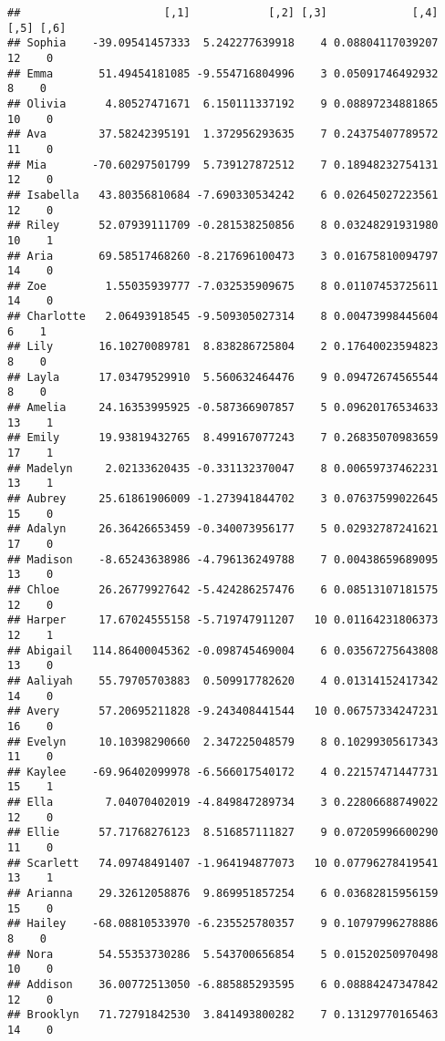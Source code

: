 \documentclass[
]{article}
\begin{document}
\begin{verbatim}
##                      [,1]            [,2] [,3]             [,4] [,5] [,6]
## Sophia    -39.09541457333  5.242277639918    4 0.08804117039207   12    0
## Emma       51.49454181085 -9.554716804996    3 0.05091746492932    8    0
## Olivia      4.80527471671  6.150111337192    9 0.08897234881865   10    0
## Ava        37.58242395191  1.372956293635    7 0.24375407789572   11    0
## Mia       -70.60297501799  5.739127872512    7 0.18948232754131   12    0
## Isabella   43.80356810684 -7.690330534242    6 0.02645027223561   12    0
## Riley      52.07939111709 -0.281538250856    8 0.03248291931980   10    1
## Aria       69.58517468260 -8.217696100473    3 0.01675810094797   14    0
## Zoe         1.55035939777 -7.032535909675    8 0.01107453725611   14    0
## Charlotte   2.06493918545 -9.509305027314    8 0.00473998445604    6    1
## Lily       16.10270089781  8.838286725804    2 0.17640023594823    8    0
## Layla      17.03479529910  5.560632464476    9 0.09472674565544    8    0
## Amelia     24.16353995925 -0.587366907857    5 0.09620176534633   13    1
## Emily      19.93819432765  8.499167077243    7 0.26835070983659   17    1
## Madelyn     2.02133620435 -0.331132370047    8 0.00659737462231   13    1
## Aubrey     25.61861906009 -1.273941844702    3 0.07637599022645   15    0
## Adalyn     26.36426653459 -0.340073956177    5 0.02932787241621   17    0
## Madison    -8.65243638986 -4.796136249788    7 0.00438659689095   13    0
## Chloe      26.26779927642 -5.424286257476    6 0.08513107181575   12    0
## Harper     17.67024555158 -5.719747911207   10 0.01164231806373   12    1
## Abigail   114.86400045362 -0.098745469004    6 0.03567275643808   13    0
## Aaliyah    55.79705703883  0.509917782620    4 0.01314152417342   14    0
## Avery      57.20695211828 -9.243408441544   10 0.06757334247231   16    0
## Evelyn     10.10398290660  2.347225048579    8 0.10299305617343   11    0
## Kaylee    -69.96402099978 -6.566017540172    4 0.22157471447731   15    1
## Ella        7.04070402019 -4.849847289734    3 0.22806688749022   12    0
## Ellie      57.71768276123  8.516857111827    9 0.07205996600290   11    0
## Scarlett   74.09748491407 -1.964194877073   10 0.07796278419541   13    1
## Arianna    29.32612058876  9.869951857254    6 0.03682815956159   15    0
## Hailey    -68.08810533970 -6.235525780357    9 0.10797996278886    8    0
## Nora       54.55353730286  5.543700656854    5 0.01520250970498   10    0
## Addison    36.00772513050 -6.885885293595    6 0.08884247347842   12    0
## Brooklyn   71.72791842530  3.841493800282    7 0.13129770165463   14    0

\end{verbatim}
\end{document}
